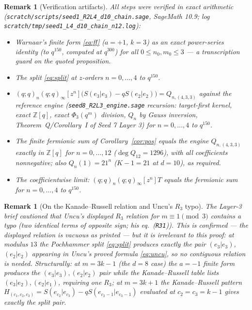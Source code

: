 \documentclass[11pt]{article}
\newtheorem{remark}[theorem]{Remark}
\newcommand{\poch}[1]{(q;q)_{#1}}
\begin{document}
\begin{remark}[Verification artifacts]
All steps were verified in exact arithmetic
(\texttt{scratch/scripts/seed1\_R2L4\_d10\_chain.sage}, SageMath 10.9;
log \texttt{scratch/tmp/seed1\_L4\_d10\_chain\_n12.log}):
\begin{itemize}
\item[{[FF]}] Warnaar's finite form \eqref{eq:ff} ($a=+1$, $k=3$) as an
exact power-series identity (to $q^{150}$, computed at $q^{300}$) for all
$0\le n_0,m_0\le 3$ --- a transcription guard on the quoted proposition.
\item[{[A]}] The split \eqref{eq:split} at $z$-orders $n=0,\dots,4$ to
$q^{150}$.
\item[{[B]}] $\poch{n}(q;q)_\infty[z^n]\bigl(S(e_3|e_3)-qS(e_2|e_2)\bigr)
=Q_{n,(4,3,3)}$ against the reference engine
(\texttt{seed8\_R2L3\_engine.sage} recursion: target-first kernel, exact
$\mathbb{Z}[q]$, exact $\Phi_3(q^m)$ division, $Q_n$ by Gauss inversion,
Theorem~Q/Corollary~I of Seed 7 Layer 3) for $n=0,\dots,4$ to $q^{150}$.
\item[{[C]}] The finite fermionic sum of Corollary~\ref{cor:pos} equals
the engine $Q_{n,(4,3,3)}$ \emph{exactly in} $\mathbb{Z}[q]$ for
$n=0,\dots,12$ ($\deg Q_{12}=1296$), with all coefficients nonnegative;
also $Q_n(1)=21^n$ ($K-1=21$ at $d=10$), as required.
\item[{[D]}] The coefficientwise limit: $\poch{n}(q;q)_\infty[z^n]T$
equals the fermionic sum for $n=0,\dots,4$ to $q^{150}$.
\end{itemize}
\end{remark}

\begin{remark}[On the Kanade--Russell relation and Uncu's $R_3$ typo]
The Layer-3 brief cautioned that Uncu's displayed $R_3$ relation for
$m\equiv1\pmod 3$ contains a typo (two identical terms of opposite sign;
his eq.\ (\texttt{R31})). This is confirmed --- the displayed relation is
vacuous as printed --- but it is \emph{irrelevant to this proof}: at
modulus $13$ the Pochhammer split \eqref{eq:split} produces exactly the
pair $(e_3|e_3)$, $(e_2|e_2)$ appearing in Uncu's proved formula
\eqref{eq:uncu}, so no contiguous relation is needed. Structurally: at
$m=3k-1$ (the $d=8$ case) the $a=-1$ finite form produces the
$(e_3|e_3),(e_2|e_2)$ pair while the Kanade--Russell table lists
$(e_3|e_2),(e_2|e_1)$, requiring one $R_3$; at $m=3k+1$ the
Kanade--Russell pattern $H_{(c_1,c_2,c_3)}=S(e_{c_2}|e_{c_3})
-qS(e_{c_2-1}|e_{c_3-1})$ evaluated at $c_2=c_3=k-1$ gives exactly the
split pair.
\end{remark}
\end{document}
